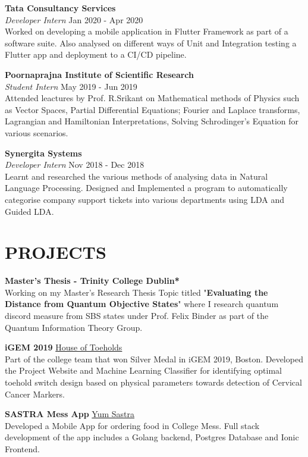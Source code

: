 \documentclass[a4paper,9pt]{extarticle}
\begin{document}
\noindent
\textbf{Tata Consultancy Services}\\[1pt]
\textit{Developer Intern} \hfill Jan 2020 - Apr 2020\\[1pt]
Worked on developing a mobile application in Flutter Framework as part of a software suite. Also analysed on different ways of
Unit and Integration testing a Flutter app and deployment to a CI/CD pipeline.

\noindent
\textbf{Poornaprajna Institute of Scientific Research}\\[1pt]
\textit{Student Intern} \hfill May 2019 - Jun 2019\\[1pt]
Attended leactures by Prof. R.Srikant on Mathematical methods of Physics such as Vector Spaces, Partial Differential Equations; Fourier and Laplace transforms, Lagrangian and Hamiltonian Interpretations, Solving Schrodinger’s
Equation for various scenarios.

\noindent
\textbf{Synergita Systems}\\[1pt]
\textit{Developer Intern} \hfill Nov 2018 - Dec 2018\\[1pt]
Learnt and researched the various methods of analysing data in Natural Language Processing. Designed and Implemented a
program to automatically categorise company support tickets into various departments using LDA and Guided LDA.

\section*{PROJECTS}
\noindent
\textbf{Master's Thesis - Trinity College Dublin*}\\[1pt]
Working on my Master's Research Thesis Topic titled "\textbf{Evaluating the Distance from Quantum Objective States}" where I research
quantum discord measure from SBS states under Prof. Felix Binder as part of the Quantum Information Theory Group.

\noindent
\textbf{iGEM 2019} \hfill \href{https://2019.igem.org/Team:SASTRA_Thanjavur}{House of Toeholds \faExternalLink}\\[1pt]
Part of the college team that won Silver Medal in iGEM 2019, Boston. Developed the Project Website and Machine Learning
Classifier for identifying optimal toehold switch design based on physical parameters towards detection of Cervical Cancer
Markers.

\noindent
\textbf{SASTRA Mess App} \hfill \href{https://yumsastra.vathzen.in}{Yum Sastra \faExternalLink}\\[1pt]
Developed a Mobile App for ordering food in College Mess. Full stack development of the app includes a Golang backend,
Postgres Database and Ionic Frontend.
\end{document}
